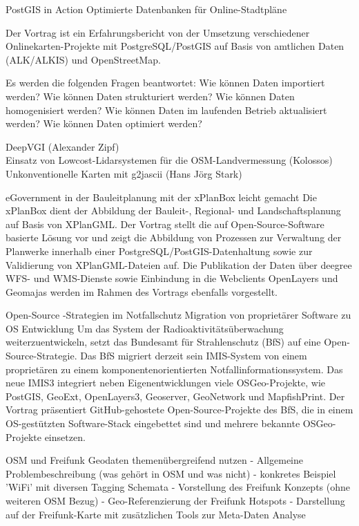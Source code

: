 %
{PostGIS in Action}%
{Optimierte Datenbanken für Online-Stadtpläne}%
{Der Vortrag ist ein Erfahrungsbericht von der Umsetzung verschiedener Onlinekarten-Projekte mit
  PostgreSQL/PostGIS auf Basis von amtlichen Daten (ALK/ALKIS) und OpenStreetMap. 

Es werden die folgenden Fragen beantwortet: Wie können Daten importiert werden? Wie können Daten
strukturiert werden? Wie können Daten homogenisiert werden? Wie können Daten im laufenden Betrieb
aktualisiert werden? Wie können Daten optimiert werden?}

%
{DeepVGI (Alexander Zipf)\\
Einsatz von Lowcost-Lidarsystemen für die OSM-Landvermessung (Kolossos)\\
Unkonventionelle Karten mit g2jascii (Hans Jörg Stark)}


%
{eGovernment in der Bauleitplanung mit der xPlanBox leicht gemacht}%
{}%
{Die xPlanBox dient der Abbildung der Bauleit-, Regional- und Landschaftsplanung auf Basis von
XPlanGML. Der Vortrag stellt die auf Open-Source-Software basierte Lösung vor und zeigt die
Abbildung von Prozessen zur Verwaltung der Planwerke innerhalb einer PostgreSQL/PostGIS-Datenhaltung
sowie zur Validierung von XPlanGML-Dateien auf. Die Publikation der Daten über deegree WFS- und
WMS-Dienste sowie Einbindung in die Webclients OpenLayers und Geomajas werden im Rahmen des Vortrags
ebenfalls vorgestellt.}

%
{Open-Source -Strategien im Notfallschutz}%
{Migration von proprietärer Software zu OS Entwicklung}%
{Um das System der Radioaktivitätsüberwachung weiterzuentwickeln, setzt das Bundesamt für
Strahlenschutz (BfS) auf eine Open-Source-Strategie. Das BfS migriert derzeit sein IMIS-System von
einem proprietären zu einem komponentenorientierten Notfallinformationssystem. Das neue IMIS3
integriert neben Eigenentwicklungen viele OSGeo-Projekte, wie PostGIS, GeoExt, OpenLayers3,
Geoserver, GeoNetwork und MapfishPrint. Der Vortrag präsentiert GitHub-gehostete
Open-Source-Projekte des BfS, die in einem OS-gestützten Software-Stack eingebettet sind und mehrere
bekannte OSGeo-Projekte einsetzen.}


%
{OSM und Freifunk}%
{Geodaten themenübergreifend nutzen}%
{- Allgemeine Problembeschreibung (was gehört in OSM und was nicht)
- konkretes Beispiel 'WiFi' mit diversen Tagging Schemata
- Vorstellung des Freifunk Konzepts (ohne weiteren OSM Bezug)
- Geo-Referenzierung der Freifunk Hotspots
- Darstellung auf der Freifunk-Karte mit zusätzlichen Tools zur Meta-Daten Analyse}


